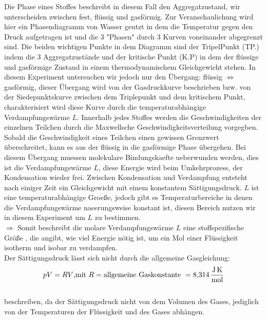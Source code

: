 Die \glqq Phase\grqq{} eines Stoffes beschreibt in diesem Fall den Aggregatzustand, wir unterscheiden zwischen fest, flüssig und gasförmig.
Zur Veranschaulichung wird hier ein Phasendiagramm von Wasser geutzt in dem die Temperatur gegen den Druck aufgetragen ist und die 3 "Phasen" 
durch 3 Kurven voneinander abgegrenzt sind. Die beiden wichtigen Punkte in dem Diagramm sind der TripelPunkt (TP.) indem die 
3 Aggregatzustände und der kritische Punkt (K.P) in dem der flüssige und gasförmige Zustand in einem 
thermodynamischem Gleichgewicht stehen.
In diesem Experiment untersuchen wir jedoch nur den Übergang: flüssig $\Leftrightarrow$ gasförmig, dieser Übergang wird von der 
Gasdruckkurve beschrieben bzw. von der Siedepunktskurve zwischen dem Triplepunkt und dem kritischem Punkt, charakterisiert wird diese 
Kurve durch die temperaturabhängige Verdampfungswärme $L$. Innerhalb jedes Stoffes werden die Geschwindigkeiten der einzelnen Teilchen
durch die Maxwellsche Geschwindigkeitsverteilung vorgegben. Sobald die Geschwindigkeit eines Teilchen einen gewissen Grenzwert 
überschreitet, kann es aus der flüssig in die gasförmige Phase übergehen. Bei diesem Übergang muessen molekulare Bindungskaefte ueberwunden
werden, dies ist die Verdampfungswärme $L$, diese Energie wird beim Umkehrprozess, der Kondensation wieder frei. Zwischen 
Kondensation und Verdampfung entsteht nach einiger Zeit ein Gleichgewicht mit einem konstantem Sättigungsdruck.
$L$ ist eine temperaturabhängige Groeße, jedoch gibt es Temperaturbereiche in denen die Verdampfungswärme naeerungsweise konstant ist, 
diesen Bereich nutzen wir in diesem Experiment um $L$ zu bestimmen.
\\$\Rightarrow$ Somit beschreibt die molare Verdampfungswärme $L$ eine stoffspezifische Größe , die angibt, wie viel Energie nötig ist,
um ein Mol einer Flüssigkeit isotherm und isobar zu verdampfen.\\
Der Sättigungsdruck lässt sich nicht durch die allgemeine Gasgleichung:
\begin{equation}
    pV=RV\text{,mit }R=\text{allgemeine Gaskonstante }= \SI{8.314}{\joule\per\mole\kelvin}\\
    \label{eqn:Gasgl}
\end{equation}
\\
beschreiben, da der Sättigungsdruck nicht von dem Volumen des Gases, jediglich von der Temperaturen der Flüssigkeit und des Gases abhängen.

